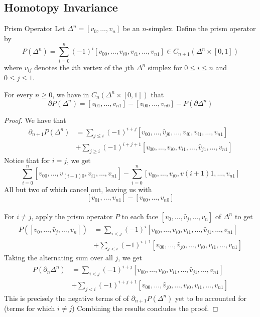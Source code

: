 \documentclass[a4paper]{article}
\begin{document}
\subsection{Homotopy Invariance}
\begin{defn}{Prism Operator}{} Let $\Delta^n=[v_0,\dots,v_n]$ be an $n$-simplex. Define the prism operator by $$P(\Delta^n)=\sum_{i=0}^n(-1)^i[v_{00},\dots,v_{i0},v_{i1},\dots,v_{n1}]\in C_{n+1}(\Delta^n\times[0,1])$$ where $v_{ij}$ denotes the $i$th vertex of the $j$th $\Delta^n$ simplex for $0\leq i\leq n$ and $0\leq j\leq 1$. 
\end{defn}

\begin{lmm}{}{} For every $n\geq 0$, we have in $C_n(\Delta^n\times[0,1])$ that $$\partial P(\Delta^n)=[v_{01},\dots,v_{n1}]-[v_{00},\dots,v_{n0}]-P(\partial\Delta^n)$$ \tcbline
\begin{proof} We have that
\begin{align*}
\partial_{n+1}P(\Delta^n)&=\sum_{j\leq i}(-1)^{i+j}[v_{00},\dots,\hat{v}_{j0},\dots,v_{i0},v_{i1},\dots,v_{n1}]\\
&+\sum_{j\geq i}(-1)^{i+j+1}[v_{00},\dots,v_{i0},v_{i1},\dots,\hat{v}_{j1},\dots,v_{n1}]
\end{align*}
Notice that for $i=j$, we get $$\sum_{i=0}^n[v_{00},\dots,v_{(i-1)0},v_{i1},\dots,v_{n1}]-\sum_{i=0}^n[v_{00},\dots,v_{i0},v{(i+1)1},\dots,v_{n1}]$$
All but two of which cancel out, leaving us with $$[v_{01},\dots,v_{n1}]-[v_{00},\dots,v_{n0}]$$~\\
For $i\neq j$, apply the prism operator $P$ to each face $[v_0,\dots,\hat{v}_j,\dots,v_n]$ of $\Delta^n$ to get 
\begin{align*}
P([v_0,\dots,\hat{v}_j,\dots,v_n])&=\sum_{i<j}(-1)^i[v_{00},\dots,v_{i0},v_{i1},\dots,\hat{v}_{j1},\dots,v_{n1}]\\
&+\sum_{j<i}(-1)^{i+1}[v_{00},\dots,\hat{v}_{j0},\dots,v_{i0},v_{i1},\dots,v_{n1}]
\end{align*}
Taking the alternating sum over all $j$, we get 
\begin{align*}
P(\partial_n\Delta^n)&=\sum_{i<j}(-1)^{i+j}[v_{00},\dots,v_{i0},v_{i1},\dots,\hat{v}_{j1},\dots,v_{n1}]\\
&+\sum_{j<i}(-1)^{i+j+1}[v_{00},\dots,\hat{v}_{j0},\dots,v_{i0},v_{i1},\dots,v_{n1}]
\end{align*}
This is precisely the negative terms of of $\partial_{n+1}P(\Delta^n)$ yet to be accounted for (terms for which $i\neq j$) Combining the results concludes the proof. 
\end{proof}
\end{lmm}
\end{document}
